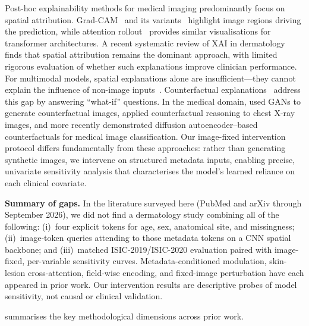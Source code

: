 \documentclass[12pt, a4paper]{article}
\begin{document}
Post-hoc explainability methods for medical imaging predominantly focus on spatial attribution. Grad-CAM~\citep{selvaraju2017grad} and its variants~\citep{chattopadhay2018grad} highlight image regions driving the prediction, while attention rollout~\citep{abnar2020quantifying} provides similar visualisations for transformer architectures. A recent systematic review of XAI in dermatology~\citep{hauser2022skin} finds that spatial attribution remains the dominant approach, with limited rigorous evaluation of whether such explanations improve clinician performance. For multimodal models, spatial explanations alone are insufficient---they cannot explain the influence of non-image inputs~\citep{nunnari2021xai}. Counterfactual explanations~\citep{mothilal2020dice, wachter2018counterfactual} address this gap by answering ``what-if'' questions. In the medical domain, \citet{mertes2022ganterfactual} used GANs to generate counterfactual images, \citet{atad2022chexplaining} applied counterfactual reasoning to chest X-ray images, and more recently \citet{atad2024counterfactual} demonstrated diffusion autoencoder--based counterfactuals for medical image classification. Our image-fixed intervention protocol differs fundamentally from these approaches: rather than generating synthetic images, we intervene on structured metadata inputs, enabling precise, univariate sensitivity analysis that characterises the model's learned reliance on each clinical covariate.

\noindent\textbf{Summary of gaps.} In the literature surveyed here (PubMed and arXiv through September 2026), we did not find a dermatology study combining all of the following: (i)~four explicit tokens for age, sex, anatomical site, and missingness; (ii)~image-token queries attending to those metadata tokens on a CNN spatial backbone; and (iii)~matched ISIC-2019/ISIC-2020 evaluation paired with image-fixed, per-variable sensitivity curves. Metadata-conditioned modulation, skin-lesion cross-attention, field-wise encoding, and fixed-image perturbation have each appeared in prior work. Our intervention results are descriptive probes of model sensitivity, not causal or clinical validation.

 summarises the key methodological dimensions across prior work.
\end{document}
